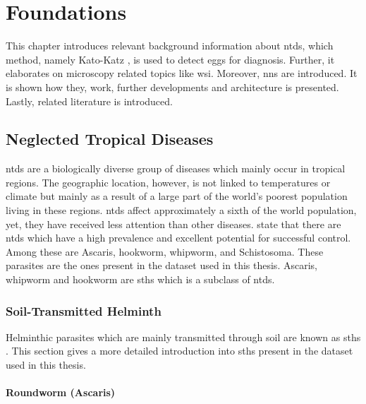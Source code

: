 \chapter{Foundations}
\label{ch:Foundations}

This chapter introduces relevant background information about \aclp{ntd}, which method, namely Kato-Katz \textcite{katz1972simple}, is used to detect eggs for diagnosis. Further, it elaborates on microscopy related topics like \ac{wsi}. Moreover, \acp{nn} are introduced. It is shown how they, work, further developments and architecture is presented. Lastly, related literature is introduced.

\section{Neglected Tropical Diseases}
\label{sec:Foundations:NTDs}

\Acp{ntd} \cite{feasey2010neglected} are a biologically diverse group of diseases which mainly occur in tropical regions. The geographic location, however, is not linked to temperatures or climate but mainly as a result of a large part of the world's poorest population living in these regions. \Acp{ntd} affect approximately a sixth of the world population, yet, they have received less attention than other diseases. \textcite{feasey2010neglected} state that there are \acp{ntd} which have a high prevalence and excellent potential for successful control. Among these are Ascaris, hookworm, whipworm, and Schistosoma. These parasites are the ones present in the dataset used in this thesis. Ascaris, whipworm and hookworm are \acp{sth} which is a subclass of \acp{ntd}.

\subsection{Soil-Transmitted Helminth} %
\label{sec:Foundations:NTDs:STHs} 

Helminthic parasites which are mainly transmitted through soil are known as \aclp{sth} \cite{feasey2010neglected,jourdan2018soiltransmitted}. This section gives a more detailed introduction into \acp{sth} present in the dataset used in this thesis.


\subsubsection{Roundworm (Ascaris)}
\label{sec:Foundations:NTDs:STHs:Ascaris}

